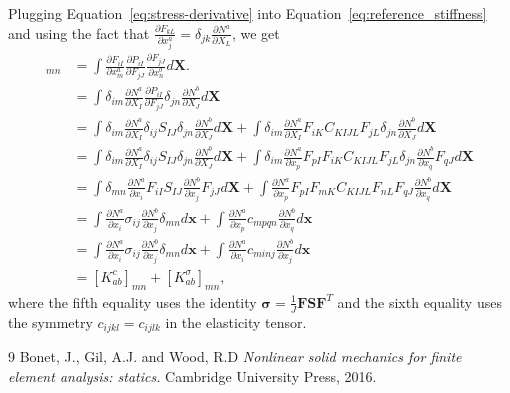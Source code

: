 \documentclass[a4paper]{article}
\newcommand{\mb}[1]{{\mathbf{#1}}}
\newcommand{\FF}{\mb{F}}
\renewcommand{\SS}{\mb{S}}
\newcommand{\XX}{\mb{X}}
\newcommand{\xx}{\mb{x}}
\newcommand{\ssigma}{\boldsymbol{\sigma}}
\begin{document}
    Plugging Equation~\ref{eq:stress-derivative} into
    Equation~\ref{eq:reference_stiffness} and using the fact that
    $\frac{\partial F_{kL}}{\partial x^a_j} = \delta_{jk} \frac{\partial
        N^a}{\partial X_L}$, we get
    \begin{align}
    [K_{ab}]_{mn}
    &= \int \frac{\partial F_{iI}}{\partial x^a_m} \frac{\partial
        P_{iI}}{\partial F_{jJ}} \frac{\partial F_{jJ}}{\partial x^b_n}
    d\XX. \\
    &= \int \delta_{im} \frac{\partial N^a}{\partial X_I} \frac{\partial
        P_{iI}}{\partial F_{jJ}}\delta_{jn}\frac{\partial N^b}{\partial
        X_J} d\XX \\
    &= \int \delta_{im} \frac{\partial N^a}{\partial X_I}
    \delta_{ij}S_{IJ}\delta_{jn}\frac{\partial N^b}{\partial X_J} d\XX +
    \int \delta_{im} \frac{\partial N^a}{\partial X_I}
    F_{iK}C_{KIJL}F_{jL}\delta_{jn}\frac{\partial N^b}{\partial X_J}
    d\XX \\
    &= \int \delta_{im} \frac{\partial N^a}{\partial X_I}
    \delta_{ij}S_{IJ}\delta_{jn}\frac{\partial N^b}{\partial X_J} d\XX +
    \int \delta_{im} \frac{\partial N^a}{\partial x_p} F_{pI}
    F_{iK}C_{KIJL}F_{jL}\delta_{jn}\frac{\partial N^b}{\partial x_q}
    F_{qJ} d\XX \\
    &= \int \delta_{mn}\frac{\partial N^a}{\partial x_i}
    F_{iI}S_{IJ}\frac{\partial N^b}{\partial x_j}F_{jJ}d\XX + \int
    \frac{\partial N^a}{\partial x_p} F_{pI} F_{mK}C_{KIJL}F_{nL}
    F_{qJ}\frac{\partial N^b}{\partial x_q} d\XX \\
    &= \int \frac{\partial N^a}{\partial x_i} \sigma_{ij}  \frac{\partial
        N^b}{\partial x_j} \delta_{mn} d\xx + \int \frac{\partial
        N^a}{\partial x_p} c_{mpqn}  \frac{\partial N^b}{\partial
        x_q}d\xx \\
    &= \int \frac{\partial N^a}{\partial x_i} \sigma_{ij}  \frac{\partial
        N^b}{\partial x_j} \delta_{mn} d\xx + \int \frac{\partial
        N^a}{\partial x_i} c_{minj}  \frac{\partial N^b}{\partial
        x_j}d\xx \\
    &= [K^c_{ab}]_{mn} + [K^\sigma_{ab}]_{mn},
    \end{align}
    where the fifth equality uses the identity $\ssigma = \frac{1}{J}\FF \SS
    \FF^T$ and the sixth equality uses the symmetry $c_{ijkl} = c_{ijlk}$ in
    the elasticity tensor.

    \begin{thebibliography}{9}
         \label{Bonet}
        Bonet, J., Gil, A.J. and Wood, R.D \textit{Nonlinear solid mechanics
        for finite element analysis: statics.} Cambridge University Press, 2016.
    \end{thebibliography}
\end{document}
